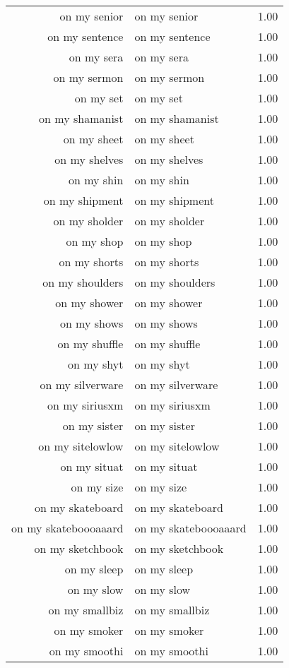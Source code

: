\begin{table}[ht]
\begin{tabular}{rlr}
  on my senior & on my senior & 1.00 \\ 
  on my sentence & on my sentence & 1.00 \\ 
  on my sera & on my sera & 1.00 \\ 
  on my sermon & on my sermon & 1.00 \\ 
  on my set & on my set & 1.00 \\ 
  on my shamanist & on my shamanist & 1.00 \\ 
  on my sheet & on my sheet & 1.00 \\ 
  on my shelves & on my shelves & 1.00 \\ 
  on my shin & on my shin & 1.00 \\ 
  on my shipment & on my shipment & 1.00 \\ 
  on my sholder & on my sholder & 1.00 \\ 
  on my shop & on my shop & 1.00 \\ 
  on my shorts & on my shorts & 1.00 \\ 
  on my shoulders & on my shoulders & 1.00 \\ 
  on my shower & on my shower & 1.00 \\ 
  on my shows & on my shows & 1.00 \\ 
  on my shuffle & on my shuffle & 1.00 \\ 
  on my shyt & on my shyt & 1.00 \\ 
  on my silverware & on my silverware & 1.00 \\ 
  on my siriusxm & on my siriusxm & 1.00 \\ 
  on my sister & on my sister & 1.00 \\ 
  on my sitelowlow & on my sitelowlow & 1.00 \\ 
  on my situat & on my situat & 1.00 \\ 
  on my size & on my size & 1.00 \\ 
  on my skateboard & on my skateboard & 1.00 \\ 
  on my skateboooaaard & on my skateboooaaard & 1.00 \\ 
  on my sketchbook & on my sketchbook & 1.00 \\ 
  on my sleep & on my sleep & 1.00 \\ 
  on my slow & on my slow & 1.00 \\ 
  on my smallbiz & on my smallbiz & 1.00 \\ 
  on my smoker & on my smoker & 1.00 \\ 
  on my smoothi & on my smoothi & 1.00 \\ 

\end{tabular}
\end{table}
